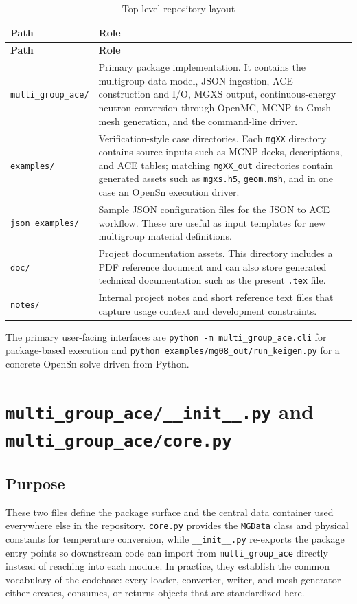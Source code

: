 \documentclass[11pt]{article}
\begin{document}
\begin{longtable}{p{} p{}}
\caption{Top-level repository layout}\label{tab:repo-layout}\\
\toprule
\textbf{Path} & \textbf{Role} \\
\midrule
\endfirsthead
\toprule
\textbf{Path} & \textbf{Role} \\
\midrule
\endhead
\texttt{multi\_group\_ace/} & Primary package implementation. It contains the multigroup data model, JSON ingestion, ACE construction and I/O, MGXS output, continuous-energy neutron conversion through OpenMC, MCNP-to-Gmsh mesh generation, and the command-line driver. \\
\texttt{examples/} & Verification-style case directories. Each \texttt{mgXX} directory contains source inputs such as MCNP decks, descriptions, and ACE tables; matching \texttt{mgXX\_out} directories contain generated assets such as \texttt{mgxs.h5}, \texttt{geom.msh}, and in one case an OpenSn execution driver. \\
\texttt{json examples/} & Sample JSON configuration files for the JSON to ACE workflow. These are useful as input templates for new multigroup material definitions. \\
\texttt{doc/} & Project documentation assets. This directory includes a PDF reference document and can also store generated technical documentation such as the present \texttt{.tex} file. \\
\texttt{notes/} & Internal project notes and short reference text files that capture usage context and development constraints. \\
\bottomrule
\end{longtable}

The primary user-facing interfaces are \texttt{python -m multi\_group\_ace.cli} for package-based execution and \texttt{python examples/mg08\_out/run\_keigen.py} for a concrete OpenSn solve driven from Python.

\section{\texttt{multi\_group\_ace/\_\_init\_\_.py} and \texttt{multi\_group\_ace/core.py}}

\subsection*{Purpose}
These two files define the package surface and the central data container used everywhere else in the repository. \texttt{core.py} provides the \texttt{MGData} class and physical constants for temperature conversion, while \texttt{\_\_init\_\_.py} re-exports the package entry points so downstream code can import from \texttt{multi\_group\_ace} directly instead of reaching into each module. In practice, they establish the common vocabulary of the codebase: every loader, converter, writer, and mesh generator either creates, consumes, or returns objects that are standardized here.
\end{document}
